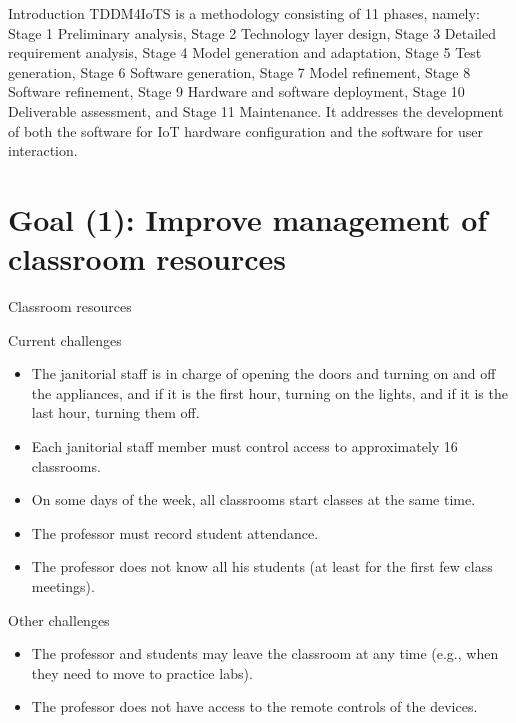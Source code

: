 \documentclass[notes=show, 10pt, xcolor=table]{beamer}
\begin{document}
\begin{frame}{Introduction}
{            TDDM4IoTS is a methodology consisting of 11 phases, namely: Stage 1 Preliminary analysis, Stage 2 Technology layer design, Stage 3 Detailed requirement analysis, Stage 4 Model generation and adaptation, Stage 5 Test generation, Stage 6 Software generation, Stage 7 Model refinement, Stage 8 Software refinement, Stage 9 Hardware and software deployment, Stage 10 Deliverable assessment, and Stage 11 Maintenance. It addresses the development of both the software for IoT hardware configuration and the software for user interaction.
            }
    \end{frame}
\section{Goal (1): Improve management of classroom resources}
    \begin{frame}{Classroom resources}
        \begin{block}{Current challenges}
            \begin{itemize}
                \item The janitorial staff is in charge of opening the doors and turning on and off the appliances, and if it is the first hour, turning on the lights, and if it is the last hour, turning them off.
                \item Each janitorial staff member must control access to approximately 16 classrooms.
                \item On some days of the week, all classrooms start classes at the same time.
                \item The professor must record student attendance.
                \item The professor does not know all his students (at least for the first few class meetings).
            \end{itemize}
        \end{block}
        \begin{block}{Other challenges}
            \begin{itemize}
                \item The professor and students may leave the classroom at any time (e.g., when they need to move to practice labs).
                \item The professor does not have access to the remote controls of the devices.
            \end{itemize}
        \end{block}
\end{frame}
\end{document}
